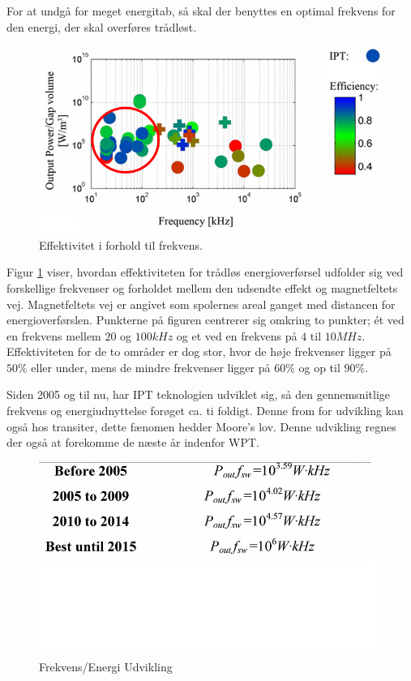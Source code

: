 For at undgå for meget energitab, så skal der benyttes en optimal frekvens for den energi, der skal overføres trådløst. \cite{limit}

\begin{figure}[H]
\centering
\includegraphics[scale=0.5]{Vildledning/Schematics/Power_vs_frekvens.png}
\caption{Effektivitet i forhold til frekvens. \cite{limit}}
\label{frekvens}
\end{figure}

Figur \ref{frekvens} viser, hvordan effektiviteten for trådløs energioverførsel udfolder sig ved forskellige frekvenser og forholdet mellem den udsendte effekt og magnetfeltets vej. Magnetfeltets vej er angivet som spolernes areal ganget med distancen for energioverførslen. Punkterne på figuren centrerer sig omkring to punkter; ét ved en frekvens mellem $20$ og $100kHz$ og et ved en frekvens på $4$ til $10MHz$. Effektiviteten for de to områder er dog stor, hvor de høje frekvenser ligger på $50\%$ eller under, mens de mindre frekvenser ligger på $60\%$ og op til $90\%$.

Siden 2005 og til nu, har IPT teknologien udviklet sig, så den gennemsnitlige frekvens og energiudnyttelse forøget ca. ti foldigt. Denne from for udvikling kan også hos transiter, dette fænomen hedder Moore's lov. Denne udvikling regnes der også at forekomme de næste år indenfor WPT. \cite{limit}

\begin{figure}[H]
\centering
\includegraphics[scale=0.5]{Vildledning/Schematics/frekvens_energi}
\caption{Frekvens/Energi Udvikling \cite{limit}}
\end{figure}

